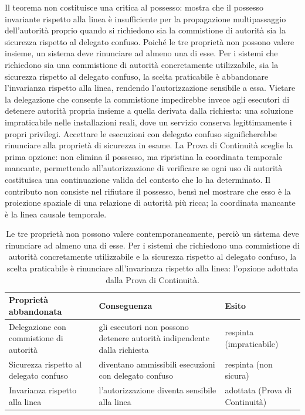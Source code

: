 \documentclass[11pt]{article}
\begin{document}
Il teorema non costituisce una critica al possesso: mostra che il possesso
invariante rispetto alla linea è insufficiente per la propagazione multipassaggio
dell'autorità proprio quando si richiedono sia la commistione di autorità sia la
sicurezza rispetto al delegato confuso. Poiché le tre proprietà non possono
valere insieme, un sistema deve rinunciare ad almeno una di esse. Per i sistemi
che richiedono sia una commistione di autorità concretamente utilizzabile, sia
la sicurezza rispetto al delegato confuso, la scelta praticabile è abbandonare
l'invarianza rispetto alla linea, rendendo l'autorizzazione sensibile a essa.
Vietare la delegazione che consente la commistione impedirebbe invece agli
esecutori di detenere autorità propria insieme a quella derivata dalla richiesta:
una soluzione impraticabile nelle installazioni reali, dove un servizio conserva
legittimamente i propri privilegi. Accettare le esecuzioni con delegato confuso
significherebbe rinunciare alla proprietà di sicurezza in esame. La Prova di
Continuità sceglie la prima opzione: non elimina il possesso, ma ripristina la
coordinata temporale mancante, permettendo all'autorizzazione di verificare se
ogni uso di autorità costituisca una continuazione valida del contesto che lo ha
determinato. Il contributo non consiste nel rifiutare il possesso, bensì nel
mostrare che esso è la proiezione spaziale di una relazione di autorità più
ricca; la coordinata mancante è la linea causale temporale.

\begin{table}[ht]
\centering
\small
\begin{tabular}{@{}p{2.9cm}p{5.0cm}p{3.1cm}@{}}
\toprule
Proprietà abbandonata & Conseguenza & Esito \\
\midrule
Delegazione con commistione di autorità & gli esecutori non possono detenere autorità indipendente dalla richiesta & respinta (impraticabile) \\
Sicurezza rispetto al delegato confuso & diventano ammissibili esecuzioni con delegato confuso & respinta (non sicura) \\
Invarianza rispetto alla linea & l'autorizzazione diventa sensibile alla linea & adottata (Prova di Continuità) \\
\bottomrule
\end{tabular}
\caption{Le tre proprietà non possono valere contemporaneamente, perciò un
sistema deve rinunciare ad almeno una di esse. Per i sistemi che richiedono una
commistione di autorità concretamente utilizzabile e la sicurezza rispetto al
delegato confuso, la scelta praticabile è rinunciare all'invarianza rispetto alla
linea: l'opzione adottata dalla Prova di Continuità.}
\label{tab:tradeoff}
\end{table}
\end{document}
